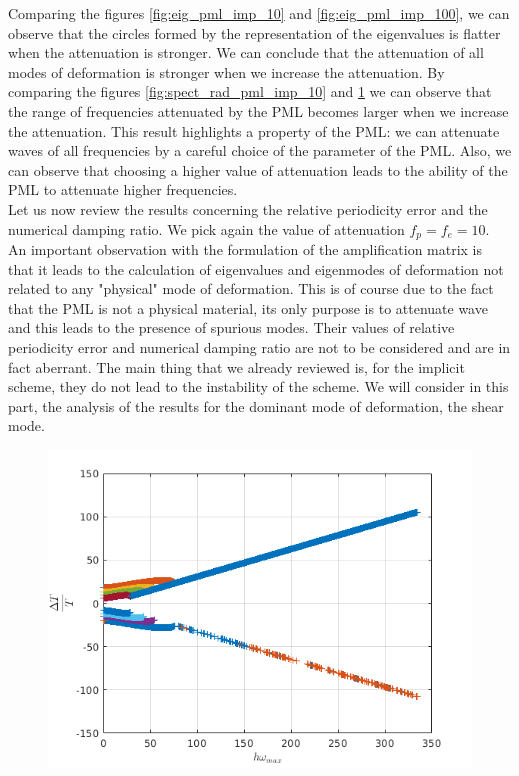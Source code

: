 \begin{itemize}
\begin{figure}[H]
\begin{minipage}{.5\textwidth}
  \label{fig:spect_rad_pml_imp_100}
\end{minipage}
\end{figure} 
Comparing the figures \ref{fig:eig_pml_imp_10} and \ref{fig:eig_pml_imp_100}, we can observe that the circles formed by the representation of the eigenvalues is flatter when the attenuation is stronger. We can conclude that the attenuation of all modes of deformation is stronger when we increase the attenuation. By comparing the figures \ref{fig:spect_rad_pml_imp_10} and \ref{fig:spect_rad_pml_imp_100} we can observe that the range of frequencies attenuated by the PML becomes larger when we increase the attenuation. This result highlights a property of the PML: we can attenuate waves of all frequencies by a careful choice of the parameter of the PML. Also, we can observe that choosing a higher value of attenuation leads to the ability of the PML to attenuate higher frequencies. \\
Let us now review the results concerning the relative periodicity error and the numerical damping ratio. We pick again the value of attenuation $f_p = f_e = 10$. An important observation with the formulation of the amplification matrix is that it leads to the calculation of eigenvalues and eigenmodes of deformation not related to any "physical" mode of deformation. This is of course due to the fact that the PML is not a physical material, its only purpose is to attenuate wave and this leads to the presence of spurious modes. Their values of relative periodicity error and numerical damping ratio are not to be considered and are in fact aberrant. The main thing that we already reviewed is, for the implicit scheme, they do not lead to the instability of the scheme. We will consider in this part, the analysis of the results for the dominant mode of deformation, the shear mode.  
\begin{figure}[H]
\centering
\begin{minipage}{.5\textwidth}
  \centering
  \includegraphics[width=1.\linewidth]{images/rel_per_err_pml_imp_10.png}

\end{minipage}
\end{figure}
\end{itemize}
